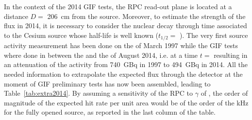	In the context of the 2014 GIF tests, the RPC read-out plane is located at a distance $D=$ \SI{206}{cm} from the source. Moreover, to estimate the strength of the flux in 2014, it is necessary to consider the nuclear decay through time associated to the Cesium source whose half-life is well known ($t_{1/2}=$ ). The very first source activity measurement has been done on the  of March 1997 while the GIF tests where done in between the  and the  of August 2014, i.e. at a time $t=$  resulting in an attenuation of the activity from \SI{740}{GBq} in 1997 to \SI{494}{GBq} in 2014. All the needed information to extrapolate the expected flux through the detector at the moment of GIF preliminary tests has now been assembled, leading to Table~\ref{tab:extra2014}. By assuming a sensitivity of the RPC to $\gamma$ of , the order of magnitude of the expected hit rate per unit area would be of the order of the \si{kHz} for the fully opened source, as reported in the last column of the table.
	
